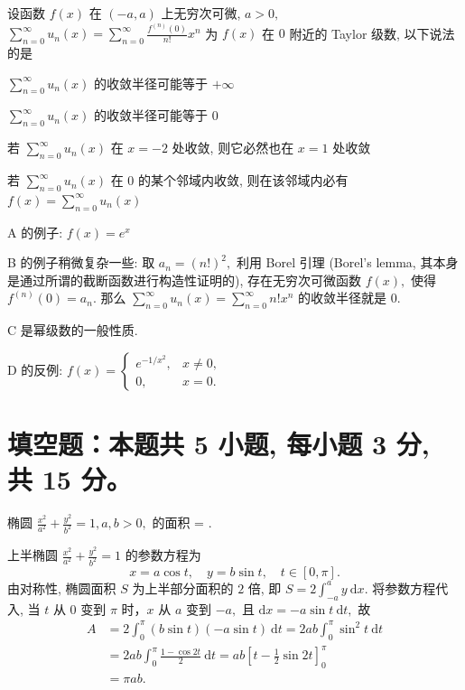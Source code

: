 \begin{question}
设函数 $f(x)$ 在 $(-a, a)$ 上无穷次可微, $a > 0,$ $\sum_{n=0}^{\infty} u_n(x) = \sum_{n=0}^{\infty} \frac{f^{(n)}(0)}{n!} x^n$ 为 $f(x)$ 在 $0$ 附近的 Taylor 级数, 以下说法的是 \paren[D]

\begin{choices}
\item $\sum_{n=0}^{\infty} u_n(x)$ 的收敛半径可能等于 $+\infty$
\item $\sum_{n=0}^{\infty} u_n(x)$ 的收敛半径可能等于 $0$
\item 若 $\sum_{n=0}^{\infty} u_n(x)$ 在 $x = -2$ 处收敛, 则它必然也在 $x = 1$ 处收敛
\item 若 $\sum_{n=0}^{\infty} u_n(x)$ 在 $0$ 的某个邻域内收敛, 则在该邻域内必有 $f(x) = \sum_{n=0}^{\infty} u_n(x)$
\end{choices}
\end{question}

\begin{solution}
A 的例子: $f(x) = e^x$

B 的例子稍微复杂一些: 取 $a_n = (n!)^2,$ 利用 Borel 引理 (Borel's lemma, 其本身是通过所谓的截断函数进行构造性证明的), 存在无穷次可微函数 $f(x),$ 使得 $f^{(n)}(0) = a_n.$ 那么 $\displaystyle \sum_{n=0}^{\infty} u_n(x) = \sum_{n=0}^{\infty} n! x^n$ 的收敛半径就是 $0.$

C 是幂级数的一般性质.

D 的反例: $f(x) = \begin{cases}
e^{-1/x^2}, & x \neq 0, \\ 0, & x = 0.
\end{cases}$
\end{solution}


\section{填空题：本题共 5 小题, 每小题 3 分, 共 15 分。}



\begin{question}
椭圆 $\frac{x^2}{a^2} + \frac{y^2}{b^2} = 1, a, b >0,$ 的面积 = \fillin[$\pi ab$].
\end{question}

\begin{solution}
上半椭圆 $\frac{x^2}{a^2} + \frac{y^2}{b^2} = 1$ 的参数方程为
\[
x = a \cos t, \quad y = b \sin t, \quad t \in [0, \pi].
\]
由对称性, 椭圆面积 $S$ 为上半部分面积的 $2$ 倍, 即 $S = 2 \int_{-a}^a y ~ \mathrm{d}x.$ 将参数方程代入, 当 $t$ 从 $0$ 变到 $\pi$ 时，$x$ 从 $a$ 变到 $-a,$ 且 $\mathrm{d}x = -a \sin t ~ \mathrm{d}t,$ 故
\begin{align*}
A & = 2 \int_0^\pi (b \sin t) (-a \sin t) ~ \mathrm{d}t = 2ab \int_0^\pi \sin^2 t ~ \mathrm{d}t \\
& = 2ab \int_0^\pi \frac{1 - \cos 2t}{2} ~ \mathrm{d}t = ab \left[ t - \frac{1}{2} \sin 2t \right]_0^\pi \\
& = \pi ab.
\end{align*}
\end{solution}


